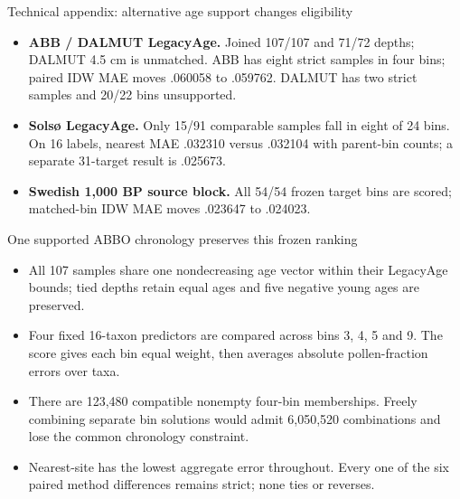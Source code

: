 \begin{frame}{Technical appendix: alternative age support changes eligibility}
\small
\begin{itemize}
\item \textbf{ABB / DALMUT LegacyAge.} Joined 107/107 and 71/72 depths; DALMUT 4.5 cm is unmatched. ABB has eight strict samples in four bins; paired IDW MAE moves .060058 to .059762. DALMUT has two strict samples and 20/22 bins unsupported.
\item \textbf{Sols\o{} LegacyAge.} Only 15/91 comparable samples fall in eight of 24 bins. On 16 labels, nearest MAE .032310 versus .032104 with parent-bin counts; a separate 31-target result is .025673.
\item \textbf{Swedish 1,000 BP source block.} All 54/54 frozen target bins are scored; matched-bin IDW MAE moves .023647 to .024023.
\end{itemize}
\end{frame}

\begin{frame}{One supported ABBO chronology preserves this frozen ranking}
\small
\begin{itemize}
\item All 107 samples share one nondecreasing age vector within their LegacyAge bounds; tied depths retain equal ages and five negative young ages are preserved.
\item Four fixed 16-taxon predictors are compared across bins 3, 4, 5 and 9. The score gives each bin equal weight, then averages absolute pollen-fraction errors over taxa.
\item There are 123,480 compatible nonempty four-bin memberships. Freely combining separate bin solutions would admit 6,050,520 combinations and lose the common chronology constraint.
\item Nearest-site has the lowest aggregate error throughout. Every one of the six paired method differences remains strict; none ties or reverses.
\end{itemize}
\end{frame}

